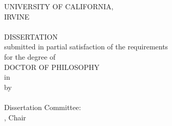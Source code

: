 \pagestyle{empty}
\centering

UNIVERSITY OF CALIFORNIA,    \\
IRVINE                       \\[3\baselineskip]
\dissertationTitle{}         \\[\baselineskip]
DISSERTATION                 \\[2\baselineskip]
submitted in partial satisfaction of the requirements \\
for the degree of            \\[2\baselineskip]
DOCTOR OF PHILOSOPHY         \\[\baselineskip]
in \dissertationDegree{}     \\[2\baselineskip]
by                           \\[2\baselineskip]
\dissertationAuthor{}        \\[10\baselineskip]
\raggedleft
Dissertation Committee:      \\
\dissertationChair{}, Chair  \\
\dissertationMemberOne{}     \\
\dissertationMemberTwo{}     \\[6\baselineskip]
\centering
\the\year{}